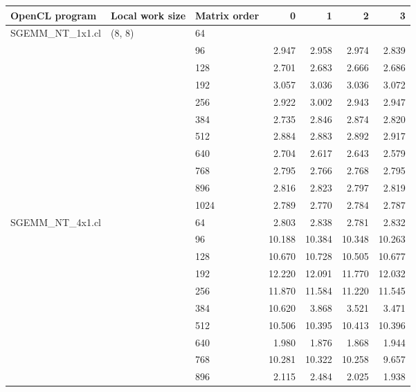 \begin{tabular}{l|l|l|rrrr}
\toprule
{\bf OpenCL program} & {\bf Local work size} & {\bf Matrix order}      &       0 &       1 &       2 &       3 \\
\midrule
SGEMM\_NT\_1x1.cl & (8, 8) & 64   &         &         &         &         \\
                &        & 96   &   2.947 &   2.958 &   2.974 &   2.839 \\
                &        & 128  &   2.701 &   2.683 &   2.666 &   2.686 \\
                &        & 192  &   3.057 &   3.036 &   3.036 &   3.072 \\
                &        & 256  &   2.922 &   3.002 &   2.943 &   2.947 \\
                &        & 384  &   2.735 &   2.846 &   2.874 &   2.820 \\
                &        & 512  &   2.884 &   2.883 &   2.892 &   2.917 \\
                &        & 640  &   2.704 &   2.617 &   2.643 &   2.579 \\
                &        & 768  &   2.795 &   2.766 &   2.768 &   2.795 \\
                &        & 896  &   2.816 &   2.823 &   2.797 &   2.819 \\
                &        & 1024 &   2.789 &   2.770 &   2.784 &   2.787 \\
\midrule
SGEMM\_NT\_4x1.cl &        & 64   &   2.803 &   2.838 &   2.781 &   2.832 \\
                &        & 96   &  10.188 &  10.384 &  10.348 &  10.263 \\
                &        & 128  &  10.670 &  10.728 &  10.505 &  10.677 \\
                &        & 192  &  12.220 &  12.091 &  11.770 &  12.032 \\
                &        & 256  &  11.870 &  11.584 &  11.220 &  11.545 \\
                &        & 384  &  10.620 &   3.868 &   3.521 &   3.471 \\
                &        & 512  &  10.506 &  10.395 &  10.413 &  10.396 \\
                &        & 640  &   1.980 &   1.876 &   1.868 &   1.944 \\
                &        & 768  &  10.281 &  10.322 &  10.258 &   9.657 \\
                &        & 896  &   2.115 &   2.484 &   2.025 &   1.938 \\

\end{tabular}
